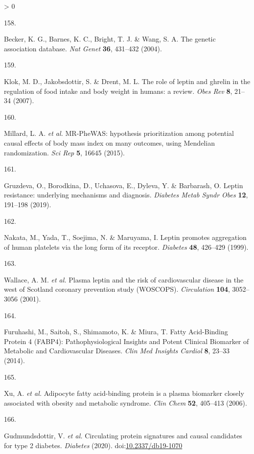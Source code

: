 \documentclass[11pt,twoside]{bristolthesis}
\newlength{\cslhangindent}
\newlength{\csllabelwidth}
\newenvironment{CSLReferences}[2] %
 {%
  \setlength{\parindent}{0pt}
  \ifodd #1 \everypar{\setlength{\hangindent}{\cslhangindent}}\ignorespaces\fi
  \ifnum #2 > 0
  \setlength{\parskip}{#2\baselineskip}
  \fi
 }%
 {}
\newcommand{\CSLLeftMargin}[1]{\parbox[t]{\csllabelwidth}{#1}}
\newcommand{\CSLRightInline}[1]{\parbox[t]{\linewidth - \csllabelwidth}{#1}\break}
\begin{document}
\begin{CSLReferences}{0}{0}
\leavevmode\hypertarget{ref-Becker2004a}{}%
\CSLLeftMargin{158. }
\CSLRightInline{Becker, K. G., Barnes, K. C., Bright, T. J. \& Wang, S. A. {The genetic association database}. \emph{Nat Genet} \textbf{36}, 431--432 (2004).}

\leavevmode\hypertarget{ref-Klok2007}{}%
\CSLLeftMargin{159. }
\CSLRightInline{Klok, M. D., Jakobsdottir, S. \& Drent, M. L. {The role of leptin and ghrelin in the regulation of food intake and body weight in humans: a review}. \emph{Obes Rev} \textbf{8}, 21--34 (2007).}

\leavevmode\hypertarget{ref-Millard2015}{}%
\CSLLeftMargin{160. }
\CSLRightInline{Millard, L. A. \emph{et al.} {MR-PheWAS: hypothesis prioritization among potential causal effects of body mass index on many outcomes, using Mendelian randomization}. \emph{Sci Rep} \textbf{5}, 16645 (2015).}

\leavevmode\hypertarget{ref-Gruzdeva2019a}{}%
\CSLLeftMargin{161. }
\CSLRightInline{Gruzdeva, O., Borodkina, D., Uchasova, E., Dyleva, Y. \& Barbarash, O. {Leptin resistance: underlying mechanisms and diagnosis}. \emph{Diabetes Metab Syndr Obes} \textbf{12}, 191--198 (2019).}

\leavevmode\hypertarget{ref-Nakata1999}{}%
\CSLLeftMargin{162. }
\CSLRightInline{Nakata, M., Yada, T., Soejima, N. \& Maruyama, I. {Leptin promotes aggregation of human platelets via the long form of its receptor}. \emph{Diabetes} \textbf{48}, 426--429 (1999).}

\leavevmode\hypertarget{ref-Wallace2001}{}%
\CSLLeftMargin{163. }
\CSLRightInline{Wallace, A. M. \emph{et al.} {Plasma leptin and the risk of cardiovascular disease in the west of Scotland coronary prevention study (WOSCOPS)}. \emph{Circulation} \textbf{104}, 3052--3056 (2001).}

\leavevmode\hypertarget{ref-Furuhashi2014}{}%
\CSLLeftMargin{164. }
\CSLRightInline{Furuhashi, M., Saitoh, S., Shimamoto, K. \& Miura, T. {Fatty Acid-Binding Protein 4 (FABP4): Pathophysiological Insights and Potent Clinical Biomarker of Metabolic and Cardiovascular Diseases}. \emph{Clin Med Insights Cardiol} \textbf{8}, 23--33 (2014).}

\leavevmode\hypertarget{ref-Xu2006}{}%
\CSLLeftMargin{165. }
\CSLRightInline{Xu, A. \emph{et al.} {Adipocyte fatty acid-binding protein is a plasma biomarker closely associated with obesity and metabolic syndrome}. \emph{Clin Chem} \textbf{52}, 405--413 (2006).}

\leavevmode\hypertarget{ref-Gudmundsdottir2020}{}%
\CSLLeftMargin{166. }
\CSLRightInline{Gudmundsdottir, V. \emph{et al.} {Circulating protein signatures and causal candidates for type 2 diabetes}. \emph{Diabetes} (2020). doi:\href{https://doi.org/10.2337/db19-1070}{10.2337/db19-1070}}


\end{CSLReferences}
\end{document}

